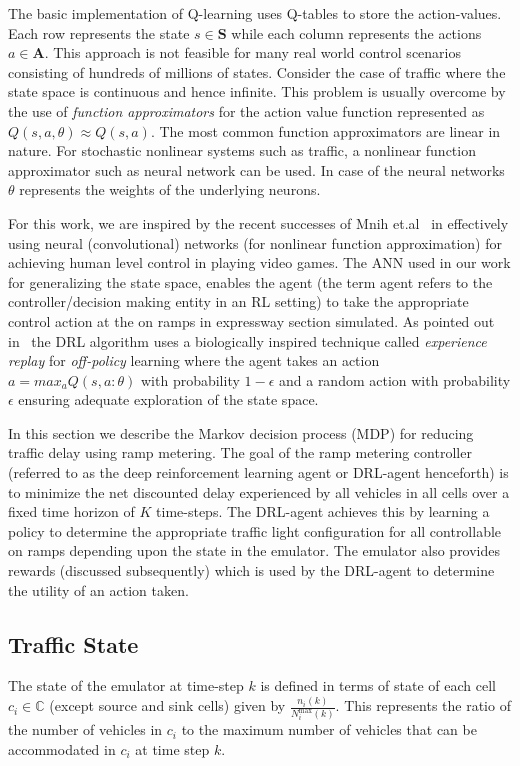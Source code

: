 \documentclass{sig-alternate-05-2015}
\begin{document}
 The basic implementation of Q-learning uses Q-tables to store the action-values. Each row represents the state $s \in \mathbf{S}$ while each column represents the actions $a \in \mathbf{A}$. This approach is not feasible for many real world control scenarios consisting of hundreds of millions of states. Consider the case of traffic where the state space is continuous and hence infinite. This problem is usually overcome by the use of {\it function approximators} for the action value function represented as $Q(s,a,\theta) \approx Q(s,a)$. The most common function approximators are linear in nature. For stochastic nonlinear systems such as traffic, a nonlinear function approximator such as neural network can be used. In case of the neural networks $\theta$ represents the weights of the underlying neurons.
 
 For this work, we are inspired by the recent successes of Mnih et.al~\cite{mnih2013playing,mnih2015human} in effectively using neural (convolutional) networks (for nonlinear function approximation) for achieving human level control in playing video games. The ANN used in our work for generalizing the state space, enables the agent (the term agent refers to the controller/decision making entity in an RL setting) to take the appropriate control action at the on ramps in expressway section simulated. As pointed out in~\cite{mnih2013playing} the DRL algorithm uses a biologically inspired technique called {\it experience replay} for {\it off-policy} learning where the agent takes an action $a=max_{a}Q(s,a:\theta)$ with probability $1-\epsilon$ and a random action with probability $\epsilon$ ensuring adequate exploration of the state space.  
 

In this section we describe the Markov decision process (MDP) for reducing traffic delay using ramp metering. The goal of the ramp metering controller (referred to as the deep reinforcement learning agent or DRL-agent henceforth) is to  minimize the net discounted delay experienced by all vehicles in all cells over a fixed time horizon of $K$ time-steps. The DRL-agent achieves this by learning a policy to determine the appropriate traffic light configuration for all controllable on ramps depending upon the state in the emulator. The emulator also provides rewards (discussed subsequently) which is used by the DRL-agent to determine the utility of an action taken.


\subsection{Traffic State}
The state of the emulator at time-step $k$ is defined in terms of state of each cell $c_i\in \mathbb{C}$ (except source and sink cells) given by $\frac{n_i(k)}{N_i^{\text{max}}(k)}$. This represents the ratio of the number of
vehicles in $c_i$ to the maximum number of vehicles that can be accommodated in $c_i$ at time step $k$.
\end{document}
